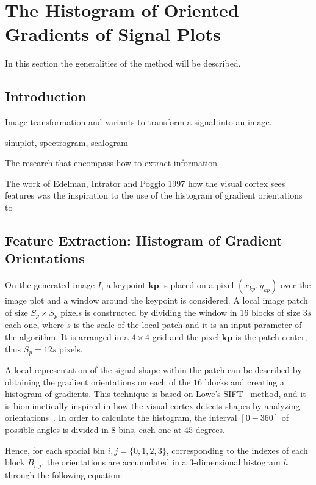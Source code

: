 \chapter{The Histogram of Oriented Gradients of Signal Plots}
\label{chapter:three}
In this section the generalities of the method will be described.

\section{Introduction}

Image transformation and variants to transform a signal into an image.

sinuplot, spectrogram, scalogram


The research that encompass how to extract information 

The work of Edelman, Intrator and Poggio 1997 how the visual cortex sees features was the inspiration to the use of the histogram of gradient orientations to 

\section{Feature Extraction: Histogram of Gradient Orientations}
\label{SIFT}


On the generated image $I$, a keypoint $\mathbf{kp}$ is placed on a pixel $(x_{kp}, y_{kp})$ over the image plot and a window around the keypoint is considered. A local image patch of size $S_p \times S_p$ pixels is constructed by dividing the window in $16$ blocks of size $3s$ each one,  where $s$ is the scale of the local patch and it is an input parameter of the algorithm. It is arranged in a $4 \times 4$ grid and the pixel $ \mathbf{kp}$ is the patch center, thus $S_p = 12s $ pixels. 

A local representation of the signal shape within the patch can be described by obtaining the gradient orientations on each of the $16$ blocks and creating a histogram of gradients.  This technique is based on Lowe's SIFT~\cite{Lowe2004} method, and it is biomimetically inspired in how the visual cortex detects shapes by analyzing orientations~\cite{cogprints561}.   In order to calculate the histogram, the interval $[0-360]$ of possible angles is divided in $8$ bins, each one at $45$ degrees.

 Hence, for each spacial bin $ i,j = \{0,1,2,3\} $, corresponding to the indexes of each block $B_{i,j}$,  the orientations are accumulated in a  $3$-dimensional histogram $h$ through the following equation: 
 

